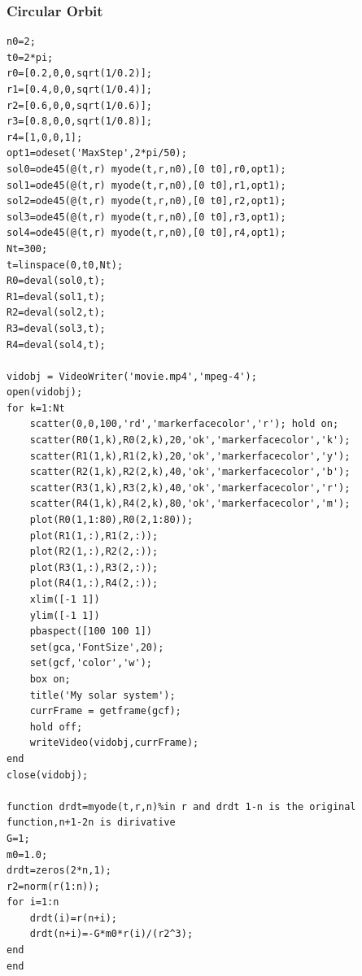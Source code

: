 \documentclass{article}
\begin{document}
\subsubsection{Circular Orbit}
\begin{lstlisting}
n0=2;
t0=2*pi;
r0=[0.2,0,0,sqrt(1/0.2)];
r1=[0.4,0,0,sqrt(1/0.4)];
r2=[0.6,0,0,sqrt(1/0.6)];
r3=[0.8,0,0,sqrt(1/0.8)];
r4=[1,0,0,1];
opt1=odeset('MaxStep',2*pi/50);
sol0=ode45(@(t,r) myode(t,r,n0),[0 t0],r0,opt1);
sol1=ode45(@(t,r) myode(t,r,n0),[0 t0],r1,opt1);
sol2=ode45(@(t,r) myode(t,r,n0),[0 t0],r2,opt1);
sol3=ode45(@(t,r) myode(t,r,n0),[0 t0],r3,opt1);
sol4=ode45(@(t,r) myode(t,r,n0),[0 t0],r4,opt1);
Nt=300;
t=linspace(0,t0,Nt);
R0=deval(sol0,t);
R1=deval(sol1,t);
R2=deval(sol2,t);
R3=deval(sol3,t);
R4=deval(sol4,t);

vidobj = VideoWriter('movie.mp4','mpeg-4');
open(vidobj);
for k=1:Nt
    scatter(0,0,100,'rd','markerfacecolor','r'); hold on;
    scatter(R0(1,k),R0(2,k),20,'ok','markerfacecolor','k');
    scatter(R1(1,k),R1(2,k),20,'ok','markerfacecolor','y');
    scatter(R2(1,k),R2(2,k),40,'ok','markerfacecolor','b');
    scatter(R3(1,k),R3(2,k),40,'ok','markerfacecolor','r');
    scatter(R4(1,k),R4(2,k),80,'ok','markerfacecolor','m');
    plot(R0(1,1:80),R0(2,1:80));
    plot(R1(1,:),R1(2,:));
    plot(R2(1,:),R2(2,:));
    plot(R3(1,:),R3(2,:));
    plot(R4(1,:),R4(2,:));
    xlim([-1 1])
    ylim([-1 1])
    pbaspect([100 100 1])
    set(gca,'FontSize',20);
    set(gcf,'color','w');
    box on;
    title('My solar system');
    currFrame = getframe(gcf);
    hold off;
    writeVideo(vidobj,currFrame);
end
close(vidobj);

function drdt=myode(t,r,n)%in r and drdt 1-n is the original function,n+1-2n is dirivative
G=1;
m0=1.0;
drdt=zeros(2*n,1);
r2=norm(r(1:n));
for i=1:n
    drdt(i)=r(n+i);
    drdt(n+i)=-G*m0*r(i)/(r2^3);
end
end
\end{lstlisting}
\end{document}
